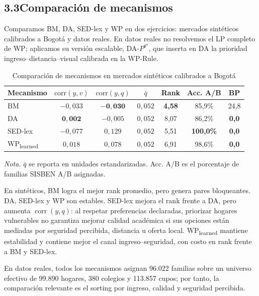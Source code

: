 \documentclass[12pt,a4paper]{article}
\begin{document}
\subsection*{3.3\quad Comparación de mecanismos}

Comparamos BM, DA, SED-lex y WP en dos ejercicios: mercados sintéticos
calibrados a Bogotá y datos reales. En datos reales no resolvemos el LP completo
de WP; aplicamos su versión escalable, DA-$P^{\theta^\star}$, que inserta en DA
la prioridad ingreso--distancia--visual calibrada en la WP-Rule.

\begin{table}[h!]
\centering
\caption{Comparación de mecanismos en mercados sintéticos calibrados a Bogotá}
\label{tab:wp_comparacion}
\footnotesize
\begin{tabular}{lcccccc}
\toprule
Mecanismo & $\text{corr}(y,v)$ & $\text{corr}(y,q)$ & $\bar q$ & Rank & Acc. A/B & BP \\
\midrule
BM                  & $-0{,}033$ & $\mathbf{-0{,}030}$ & $0{,}052$ & \textbf{4{,}58} & 85{,}9\% & 24{,}8 \\
DA                  & $\mathbf{0{,}002}$ & $-0{,}005$ & $0{,}052$ & 8{,}07 & 86{,}2\% & \textbf{0{,}0} \\
SED-lex             & $-0{,}077$ & $ 0{,}129$ & $0{,}052$ & 5{,}51 & \textbf{100{,}0\%} & \textbf{0{,}0} \\
WP\textsubscript{learned} & $ 0{,}018$ & $ 0{,}078$ & $0{,}052$ & 6{,}91 & 98{,}6\% & \textbf{0{,}0} \\
\bottomrule
\end{tabular}
\begin{minipage}{\linewidth}
\vspace{4pt}\footnotesize
\textit{Nota.} $\bar q$ se reporta en unidades estandarizadas. Acc. A/B es el
porcentaje de familias SISBEN A/B asignadas.
\end{minipage}
\end{table}

En sintéticos, BM logra el mejor rank promedio, pero genera pares bloqueantes.
DA, SED-lex y WP son estables. SED-lex mejora el rank frente a DA, pero aumenta
$\operatorname{corr}(y,q)$: al respetar preferencias declaradas, priorizar hogares
vulnerables no garantiza mejorar calidad académica si sus opciones están mediadas
por seguridad percibida, distancia u oferta local. WP\textsubscript{learned}
mantiene estabilidad y contiene mejor el canal ingreso--seguridad, con costo en
rank frente a BM y SED-lex.

En datos reales, todos los mecanismos asignan 96{.}022 familias sobre un universo
efectivo de 99{.}890 hogares, 380 colegios y 113{.}857 cupos; por tanto, la
comparación relevante es el sorting por ingreso, calidad y seguridad percibida.
\end{document}
